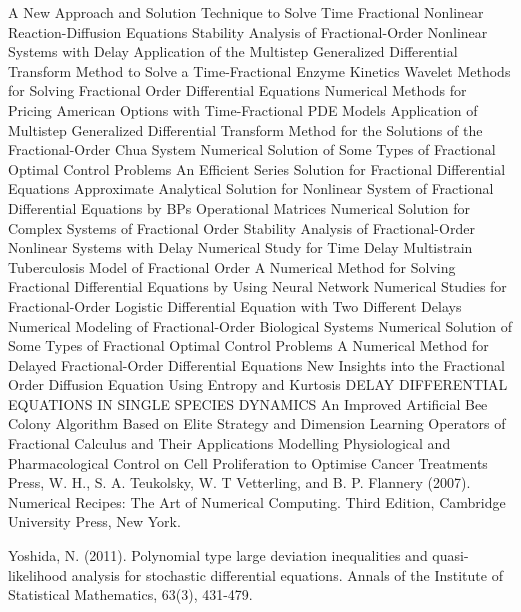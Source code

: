 \begin{thebibliography}{00}
A New Approach and Solution Technique to Solve Time Fractional Nonlinear Reaction-Diffusion Equations
Stability Analysis of Fractional-Order Nonlinear Systems with Delay
Application of the Multistep Generalized Differential Transform Method to Solve a Time-Fractional Enzyme Kinetics
Wavelet Methods for Solving Fractional Order Differential Equations
Numerical Methods for Pricing American Options with Time-Fractional PDE Models
Application of Multistep Generalized Differential Transform Method for the Solutions of the Fractional-Order Chua System
Numerical Solution of Some Types of Fractional Optimal Control Problems
An Efficient Series Solution for Fractional Differential Equations
Approximate Analytical Solution for Nonlinear System of Fractional Differential Equations by BPs Operational Matrices
Numerical Solution for Complex Systems of Fractional Order
Stability Analysis of Fractional-Order Nonlinear Systems with Delay
Numerical Study for Time Delay Multistrain Tuberculosis Model of Fractional Order
A Numerical Method for Solving Fractional Differential Equations by Using Neural Network
Numerical Studies for Fractional-Order Logistic Differential Equation with Two Different Delays
Numerical Modeling of Fractional-Order Biological Systems
Numerical Solution of Some Types of Fractional Optimal Control Problems
A Numerical Method for Delayed Fractional-Order Differential Equations
 New Insights into the Fractional Order Diffusion Equation Using Entropy and Kurtosis
 DELAY DIFFERENTIAL EQUATIONS IN SINGLE SPECIES DYNAMICS
 An Improved Artificial Bee Colony Algorithm Based on Elite Strategy and Dimension Learning
Operators of Fractional Calculus and Their Applications
 Modelling Physiological and Pharmacological Control on Cell Proliferation to Optimise Cancer Treatments
Press, W. H., S. A. Teukolsky, W. T Vetterling, and B. P. Flannery (2007). 
\newblock Numerical Recipes: The Art of Numerical Computing. 
\newblock Third Edition, Cambridge University Press, New York.

		
Yoshida, N. (2011). 
\newblock Polynomial type large deviation inequalities and quasi-likelihood analysis for stochastic differential equations. 
\newblock Annals of the Institute of Statistical Mathematics, 63(3), 431-479.


\end{thebibliography}

